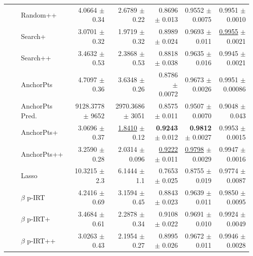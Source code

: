 \begin{longtable}{llp{}rrrrr}
 &  & Random++ & 4.0664 {\scriptsize $\pm$ 0.34} & 2.6789 {\scriptsize $\pm$ 0.22} & 0.8696 {\scriptsize $\pm$ 0.013} & 0.9552 {\scriptsize $\pm$ 0.0075} & 0.9951 {\scriptsize $\pm$ 0.0010} \\
 &  & Search+ & 3.0701 {\scriptsize $\pm$ 0.32} & 1.9719 {\scriptsize $\pm$ 0.32} & 0.8989 {\scriptsize $\pm$ 0.024} & 0.9693 {\scriptsize $\pm$ 0.011} & \underline{0.9955} {\scriptsize $\pm$ 0.0021} \\
 &  & Search++ & 3.4632 {\scriptsize $\pm$ 0.53} & 2.3868 {\scriptsize $\pm$ 0.53} & 0.8818 {\scriptsize $\pm$ 0.038} & 0.9635 {\scriptsize $\pm$ 0.016} & 0.9945 {\scriptsize $\pm$ 0.0021} \\
 &  & AnchorPts & 4.7097 {\scriptsize $\pm$ 0.36} & 3.6348 {\scriptsize $\pm$ 0.26} & 0.8786 {\scriptsize $\pm$ 0.0072} & 0.9673 {\scriptsize $\pm$ 0.0026} & 0.9951 {\scriptsize $\pm$ 0.00086} \\
 &  & AnchorPts Pred. & 9128.3778 {\scriptsize $\pm$ 9652} & 2970.3686 {\scriptsize $\pm$ 3051} & 0.8575 {\scriptsize $\pm$ 0.011} & 0.9507 {\scriptsize $\pm$ 0.0070} & 0.9048 {\scriptsize $\pm$ 0.043} \\
 &  & AnchorPts+ & 3.0696 {\scriptsize $\pm$ 0.37} & \underline{1.8410} {\scriptsize $\pm$ 0.12} & \textbf{0.9243} {\scriptsize $\pm$ 0.012} & \textbf{0.9812} {\scriptsize $\pm$ 0.0027} & 0.9953 {\scriptsize $\pm$ 0.0015} \\
 &  & AnchorPts++ & 3.2590 {\scriptsize $\pm$ 0.28} & 2.0314 {\scriptsize $\pm$ 0.096} & \underline{0.9222} {\scriptsize $\pm$ 0.011} & \underline{0.9798} {\scriptsize $\pm$ 0.0029} & 0.9947 {\scriptsize $\pm$ 0.0016} \\
 &  & Lasso & 10.3215 {\scriptsize $\pm$ 2.3} & 6.1444 {\scriptsize $\pm$ 1.1} & 0.7653 {\scriptsize $\pm$ 0.025} & 0.8755 {\scriptsize $\pm$ 0.019} & 0.9774 {\scriptsize $\pm$ 0.0087} \\
 &  & $\beta$ p-IRT & 4.2416 {\scriptsize $\pm$ 0.69} & 3.1594 {\scriptsize $\pm$ 0.45} & 0.8843 {\scriptsize $\pm$ 0.023} & 0.9639 {\scriptsize $\pm$ 0.011} & 0.9850 {\scriptsize $\pm$ 0.0095} \\
 &  & $\beta$ p-IRT+ & 3.4684 {\scriptsize $\pm$ 0.61} & 2.2878 {\scriptsize $\pm$ 0.34} & 0.9108 {\scriptsize $\pm$ 0.022} & 0.9691 {\scriptsize $\pm$ 0.010} & 0.9924 {\scriptsize $\pm$ 0.0049} \\
 &  & $\beta$ p-IRT++ & 3.0263 {\scriptsize $\pm$ 0.43} & 2.1954 {\scriptsize $\pm$ 0.27} & 0.8995 {\scriptsize $\pm$ 0.026} & 0.9672 {\scriptsize $\pm$ 0.011} & 0.9946 {\scriptsize $\pm$ 0.0028} \\

\end{longtable}
